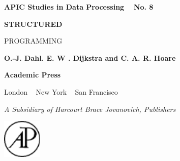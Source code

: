 \pagecolor{desertstorm}\afterpage{\nopagecolor}
{
	\color{shadesofmidnight}
	\sffamily
	\textbf{APIC Studies in Data Processing}~~ \textbf{No. 8}
	\vspace*{1.5em}
	
	{
		\Huge\sffamily\bfseries
		STRUCTURED
		\smallskip
		
		PROGRAMMING
	}
	\vspace*{2em}
	
	{
		\large
		\textbf{O.-J. Dahl. E. W . Dijkstra and C. A. R. Hoare}
	}
	
	\vfill
	
	 \begin{minipage}[position]{9cm}
	 	\vspace{-3em}
	 	
	 	\bfseries\Large Academic Press
	 	
	 	London ~ New York ~ San Francisco
	 	
	 	\normalfont\normalsize\sffamily
	 	\textit{A Subsidiary of Harcourt Brace Jovanovich, Publishers}
	\end{minipage}
	\hfill\includegraphics[width=0.14\textwidth]{./images/academic-press.pdf}
}
